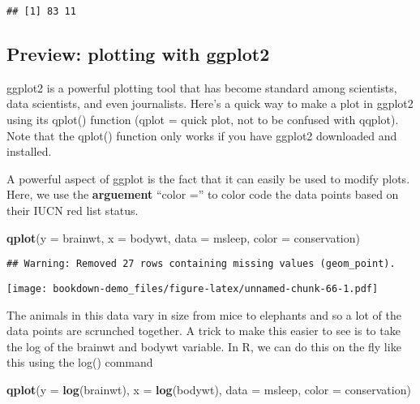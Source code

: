 \documentclass[]{book}
\newenvironment{Shaded}{\begin{snugshade}}{\end{snugshade}}
\newcommand{\KeywordTok}[1]{\textcolor[rgb]{0.13,0.29,0.53}{\textbf{#1}}}
\newcommand{\DataTypeTok}[1]{\textcolor[rgb]{0.13,0.29,0.53}{#1}}
\newcommand{\NormalTok}[1]{#1}
\theoremstyle{definition}
\theoremstyle{definition}
\theoremstyle{definition}
\theoremstyle{remark}
\begin{document}
\begin{verbatim}
## [1] 83 11
\end{verbatim}

\subsection{Preview: plotting with
ggplot2}\label{preview-plotting-with-ggplot2}

ggplot2 is a powerful plotting tool that has become standard among
scientists, data scientists, and even journalists. Here's a quick way to
make a plot in ggplot2 using its qplot() function (qplot = quick plot,
not to be confused with qqplot). Note that the qplot() function only
works if you have ggplot2 downloaded and installed.

A powerful aspect of ggplot is the fact that it can easily be used to
modify plots. Here, we use the \textbf{arguement} ``color ='' to color
code the data points based on their IUCN red list status.

\begin{Shaded}
\begin{Highlighting}[]
\KeywordTok{qplot}\NormalTok{(}\DataTypeTok{y =}\NormalTok{ brainwt, }\DataTypeTok{x =}\NormalTok{ bodywt, }\DataTypeTok{data =}\NormalTok{ msleep, }\DataTypeTok{color =}\NormalTok{ conservation)}
\end{Highlighting}
\end{Shaded}

\begin{verbatim}
## Warning: Removed 27 rows containing missing values (geom_point).
\end{verbatim}

\texttt{[image: bookdown-demo\_files/figure-latex/unnamed-chunk-66-1.pdf]}

The animals in this data vary in size from mice to elephants and so a
lot of the data points are scrunched together. A trick to make this
easier to see is to take the log of the brainwt and bodywt variable. In
R, we can do this on the fly like this using the log() command

\begin{Shaded}
\begin{Highlighting}[]
\KeywordTok{qplot}\NormalTok{(}\DataTypeTok{y =} \KeywordTok{log}\NormalTok{(brainwt), }\DataTypeTok{x =} \KeywordTok{log}\NormalTok{(bodywt), }\DataTypeTok{data =}\NormalTok{ msleep, }\DataTypeTok{color =}\NormalTok{ conservation)}
\end{Highlighting}
\end{Shaded}
\end{document}
